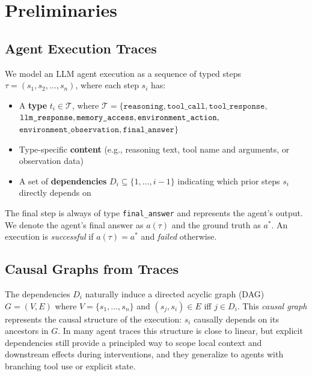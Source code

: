 \documentclass{article}
\theoremstyle{plain}
\theoremstyle{definition}
\theoremstyle{remark}
\begin{document}
\section{Preliminaries}

\subsection{Agent Execution Traces}

We model an LLM agent execution as a sequence of typed steps $\tau = (s_1, s_2, \ldots, s_n)$, where each step $s_i$ has:
\begin{itemize}
    \item A \textbf{type} $t_i \in \mathcal{T}$, where $\mathcal{T} = \{\texttt{reasoning}, \texttt{tool\_call}, \texttt{tool\_response},$ \\ $\texttt{llm\_response}, \texttt{memory\_access}, \\ \texttt{environment\_action},$ \\ $\texttt{environment\_observation}, \texttt{final\_answer}\}$
    \item Type-specific \textbf{content} (e.g., reasoning text, tool name and arguments, or observation data)
    \item A set of \textbf{dependencies} $D_i \subseteq \{1, \ldots, i-1\}$ indicating which prior steps $s_i$ directly depends on
\end{itemize}

The final step is always of type \texttt{final\_answer} and represents the agent's output. We denote the agent's final answer as $a(\tau)$ and the ground truth as $a^*$. An execution is \emph{successful} if $a(\tau) = a^*$ and \emph{failed} otherwise.

\subsection{Causal Graphs from Traces}

The dependencies $D_i$ naturally induce a directed acyclic graph (DAG) $G = (V, E)$ where $V = \{s_1, \ldots, s_n\}$ and $(s_j, s_i) \in E$ iff $j \in D_i$. This \emph{causal graph} represents the causal structure of the execution: $s_i$ causally depends on its ancestors in $G$.
In many agent traces this structure is close to linear, but explicit dependencies still provide a principled way to scope local context and downstream effects during interventions, and they generalize to agents with branching tool use or explicit state.
\end{document}
